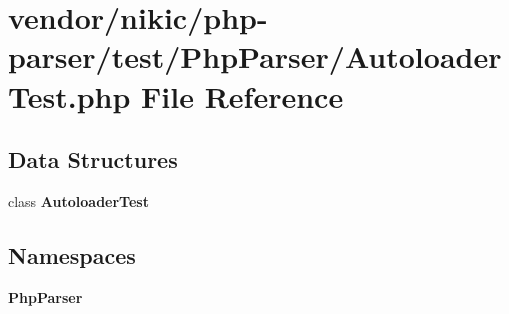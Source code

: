 \section{vendor/nikic/php-\/parser/test/\+Php\+Parser/\+Autoloader\+Test.php File Reference}
\label{nikic_2php-parser_2test_2_php_parser_2_autoloader_test_8php}
\subsection*{Data Structures}
\begin{DoxyCompactItemize}
\item 
class {\bf Autoloader\+Test}
\end{DoxyCompactItemize}
\subsection*{Namespaces}
\begin{DoxyCompactItemize}
\item 
 {\bf Php\+Parser}
\end{DoxyCompactItemize}
